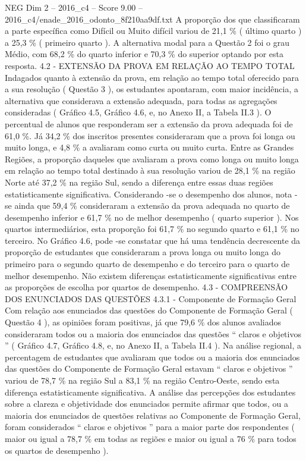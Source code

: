 \begin{textsample}{NEG Dim 2 – 2016\_c4 – Score 9.00 – 2016\_c4/enade\_2016\_odonto\_8f210aa9df.txt}
A proporção dos que classificaram a parte específica como Difícil ou Muito difícil variou de 21,1 \% ( último quarto ) a 25,3 \% ( primeiro quarto ).
A alternativa modal para a Questão 2 foi o grau Médio, com 68,2 \% do quarto inferior e 70,3 \% do superior optando por esta resposta. 4.2 - EXTENSÃO DA PROVA EM RELAÇÃO AO TEMPO TOTAL Indagados quanto à extensão da prova, em relação ao tempo total oferecido para a sua resolução ( Questão 3 ), os estudantes apontaram, com maior incidência, a alternativa que considerava a extensão adequada, para todas as agregações consideradas ( Gráfico 4.5, Gráfico 4.6, e, no Anexo II, a Tabela II.3 ).
O percentual de alunos que responderam ser a extensão da prova adequada foi de 61,0 \%.
Já 34,2 \% dos inscritos presentes consideraram que a prova foi longa ou muito longa, e 4,8 \% a avaliaram como curta ou muito curta.
Entre as Grandes Regiões, a proporção daqueles que avaliaram a prova como longa ou muito longa em relação ao tempo total destinado à sua resolução variou de 28,1 \% na região Norte até 37,2 \% na região Sul, sendo a diferença entre essas duas regiões estatisticamente significativa.
Considerando -se o desempenho dos alunos, nota -se ainda que 59,4 \% consideraram a extensão da prova adequada no quarto de desempenho inferior e 61,7 \% no de melhor desempenho ( quarto superior ).
Nos quartos intermediários, esta proporção foi 61,7 \% no segundo quarto e 61,1 \% no terceiro.
No Gráfico 4.6, pode -se constatar que há uma tendência decrescente da proporção de estudantes que consideraram a prova longa ou muito longa do primeiro para o segundo quarto de desempenho e do terceiro para o quarto de melhor desempenho.
Não existem diferenças estatisticamente significativas entre as proporções de escolha por quartos de desempenho. 4.3 - COMPREENSÃO DOS ENUNCIADOS DAS QUESTÕES 4.3.1 - Componente de Formação Geral Com relação aos enunciados das questões do Componente de Formação Geral ( Questão 4 ), as opiniões foram positivas, já que 79,6 \% dos alunos avaliados consideraram todos ou a maioria dos enunciados das questões “ claros e objetivos ” ( Gráfico 4.7, Gráfico 4.8, e, no Anexo II, a Tabela II.4 ).
Na análise regional, a percentagem de estudantes que avaliaram que todos ou a maioria dos enunciados das questões do Componente de Formação Geral estavam “ claros e objetivos ” variou de 78,7 \% na região Sul a 83,1 \% na região Centro-Oeste, sendo esta diferença estatisticamente significativa.
A análise das percepções dos estudantes sobre a clareza e objetividade dos enunciados permite afirmar que todos, ou a maioria dos enunciados de questões relativas ao Componente de Formação Geral, foram considerados “ claros e objetivos ” para a maior parte dos respondentes ( maior ou igual a 78,7 \% em todas as regiões e maior ou igual a 76 \% para todos os quartos de desempenho ).

\end{textsample}
